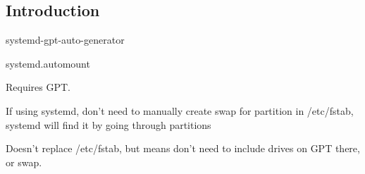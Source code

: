 
\subsection{Introduction}


systemd-gpt-auto-generator

systemd.automount

Requires GPT.

If using systemd, don't need to manually create swap for partition in /etc/fstab, systemd will find it by going through partitions

Doesn't replace /etc/fstab, but means don't need to include drives on GPT there, or swap.
